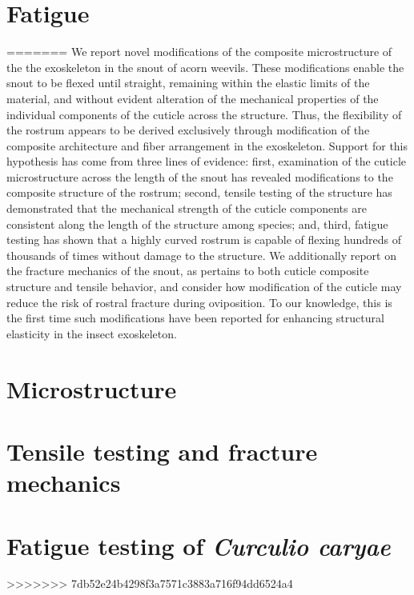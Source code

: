 \documentclass[twocolumn, linenumbers, superscriptaddress]{revtex4-1}
\begin{document}
	\section*{Fatigue}
=======
	We report novel modifications of the composite microstructure of the the exoskeleton in the snout of acorn weevils.
	These modifications enable the snout to be flexed until straight, remaining within the elastic limits of the material, and without evident alteration of the mechanical properties of the individual components of the cuticle across the structure.
	Thus, the flexibility of the rostrum appears to be derived exclusively through modification of the composite architecture and fiber arrangement in the exoskeleton.
	Support for this hypothesis has come from three lines of evidence: first, examination of the cuticle microstructure across the length of the snout has revealed modifications to the composite structure of the rostrum; second, tensile testing of the structure has demonstrated that the mechanical strength of the cuticle components are consistent along the length of the structure among species; and, third, fatigue testing has shown that a highly curved rostrum is capable of flexing hundreds of thousands of times without damage to the structure.
	We additionally report on the fracture mechanics of the snout, as pertains to both cuticle composite structure and tensile behavior, and consider how modification of the cuticle may reduce the risk of rostral fracture during oviposition.
	To our knowledge, this is the first time such modifications have been reported for enhancing structural elasticity in the insect exoskeleton.
	
	\section*{Microstructure}
		\lipsum
	
	\section*{Tensile testing and fracture mechanics}
		\lipsum
		
	\section*{Fatigue testing of \textit{Curculio caryae}}
>>>>>>> 7db52e24b4298f3a7571c3883a716f94dd6524a4
		\lipsum

\end{document}
